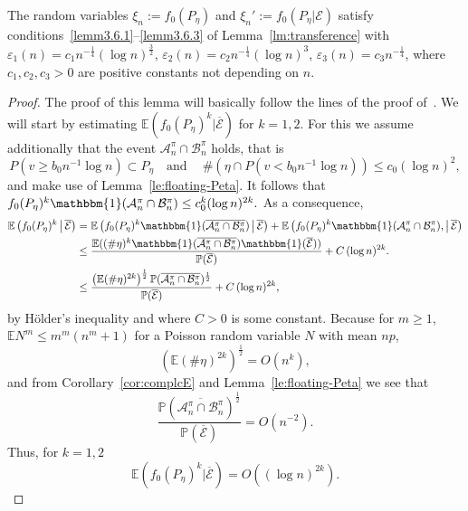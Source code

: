 \documentclass[AHL,Unicode,longabstracts,published]{cedram}
\newcommand{\ind}{\mathbbm{1}}
\newcommand{\bbE}{\mathbb{E}}
\newcommand{\bbP}{\mathbb{P}}
\newcommand{\clA}{\mathcal{A}}
\newcommand{\clB}{\mathcal{B}}
\newcommand{\clE}{\mathcal{E}}
\begin{document}
\begin{lemm}\label{lm:condition}
The random variables $\xi_n:=f_0(P_{\eta})$ and $\xi_n':=f_0(P_{\eta}|\clE)$ satisfy conditions~\eqref{lemm3.6.1}--\eqref{lemm3.6.3} of Lemma~\ref{lm:transference} with $\varepsilon_1(n)=c_1n^{-\frac 14} (\log n)^{\frac 32}$, $\varepsilon_2(n)=c_2n^{-\frac 14} (\log n)^3$, $\varepsilon_3(n)=c_3 n^{-\frac 14}$, where $c_1,c_2,c_3>0$ are positive constants not depending on $n$.
\end{lemm}


\begin{proof}
The proof of this lemma will basically follow the lines of the proof of~\cite[Lemma~8.2]{BR10}. We will start by estimating $\bbE(f_0(P_{\eta})^k|\overline{\clE})$ for $k=1,2$. For this we assume additionally that the event $\clA^\pi_n \cap \clB^\pi_n$ holds, that is
\[
P\left(v\ge b_0 n^{-1} \log n\right)\subset P_{\eta}\quad\text{and}\quad \ \#\left(\eta \cap P\left(v< b_0 n^{-1} \log n\right)\right)\leq c_0 (\log n)^2,
\]
and make use of Lemma~\ref{le:floating-Peta}. It follows that $ f_0(P_{\eta})^k \ind (\clA^\pi_n \cap \clB^\pi_n) \leq c_0^{k} (\log n)^{2k}. $ As a consequence,
\begin{align*}
\bbE\left(f_0(P_{\eta})^k\,\middle|\,\overline{\clE}\right)&=\bbE\left(f_0(P_{\eta})^k \ind (\overline{\clA^\pi_n \cap \clB^\pi_n})\,\middle|\,\overline{\clE}\right)+ \bbE\left(f_0(P_{\eta})^k\ind (\clA^\pi_n \cap \clB^\pi_n),\middle|\,\overline{\clE}\right)
\\ &\leq
\frac{\bbE((\# \eta)^k \ind (\overline{\clA^\pi_n \cap \clB^\pi_n}) \ind (\overline{\clE}))}{\bbP(\overline{\clE})}+ C\,(\log n)^{2k}.
\\ &\leq
\frac{\left(\bbE(\# \eta)^{2k}\right)^{\frac12} \bbP (\overline{\clA^\pi_n \cap \clB^\pi_n})^{\frac 12}}{\bbP(\overline{\clE})}+ C\,(\log n)^{2k},
\end{align*}
by H\"older's inequality and where $C>0$ is some constant. Because for $m \geq 1$, $\bbE N^{m} \leq m^m (n^m+1)$ for a Poisson random variable $N$ with mean $np$,
\[
\left(\bbE(\# \eta)^{2k}\right)^{\frac12} = O(n^{k}),
\]
and from Corollary~\ref{cor:complcE} and Lemma~\ref{le:floating-Peta} we see that
\[
\frac{\bbP(\overline{\clA^\pi_n \cap \clB^\pi_n})^{\frac 12}}{\bbP(\overline{\clE})} = O\left(n^{- 2}\right).
\]
Thus, for $k=1,2$
\begin{equation}\label{eq:3}
\bbE(f_0(P_{\eta})^k|\overline{\clE}) = O\left((\log n)^{2k}\right).
\end{equation}


\end{proof}
\end{document}
